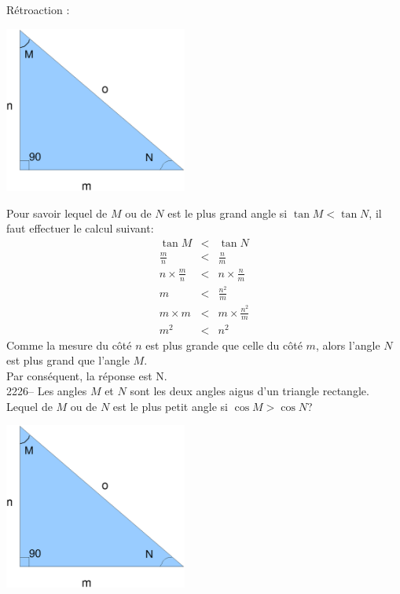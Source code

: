 \documentclass[letterpaper, 12pt]{article}
\begin{document}
R\'etroaction :\\
\begin{center}
 \includegraphics[width=6cm,bb=14 14 583 529]{Triangle_rectangle3.eps}
\end{center}
Pour savoir lequel de $M$ ou de $N$ est le plus grand angle si $\tan{M}<\tan{N}$, il faut effectuer le calcul suivant:
\begin{eqnarray*}
 \tan{M}&<&\tan{N}\\[2mm]
\frac{m}{n}&<&\frac{n}{m}\\[2mm]
n\times\frac{m}{n}&<&n\times \frac{n}{m}\\[2mm]
m&<&\frac{n^{2}}{m}\\[2mm]
m\times m&<&m\times \frac{n^{2}}{m}\\[2mm]
m^{2}&<&n^{2}
\end{eqnarray*}
Comme la mesure du c\^ot\'e $n$ est plus grande que celle du c\^ot\'e $m$, alors l'angle $N$ est plus grand que l'angle $M$.\\
Par cons\'equent, la r\'eponse est N.\\

2226-- Les angles $M$ et $N$ sont les deux angles aigus d'un triangle rectangle. Lequel de $M$ ou de $N$ est le plus petit angle si $\cos{M}>\cos{N}$? \\
\begin{center}
 \includegraphics[width=6cm,bb=14 14 583 529]{Triangle_rectangle3.eps}
\end{center}
\end{document}
